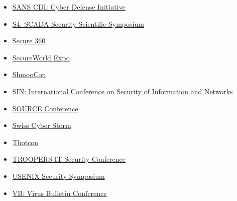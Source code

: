 \documentclass[a4paper, 12pt, titlepage]{report}
\begin{document}
\begin{multicols}{2}
\begin{itemize}
\item \href{https://www.sans.org/information-security-training/by-location/north-america}{SANS CDI: Cyber Defense Initiative}
\item \href{https://www.digitalbond.com/s4/}{S4: SCADA Security Scientific Symposium}
\item \href{https://secure360.org/}{Secure 360}
\item \href{https://www.secureworldexpo.com/}{SecureWorld Expo}
\item \href{https://www.shmoocon.org/}{ShmooCon}
\item \href{http://www.sinconf.org/sin2019/index.html}{SIN: International Conference on Security of Information and Networks}
\item \href{https://sourceconference.com/}{SOURCE Conference}
\item \href{https://www.swisscyberstorm.com/}{Swiss Cyber Storm}
\item \href{https://thotcon.org/}{Thotcon}
\item \href{https://troopers.de/}{TROOPERS IT Security Conference}
\item \href{https://www.usenix.org/conferences/byname/108}{USENIX Security Symposium}
\item \href{https://www.virusbulletin.com/conference/vb2019/}{VB: Virus Bulletin Conference}
\end{itemize}
\end{multicols}
\printbibliography[heading=bibintoc]
\end{document}
